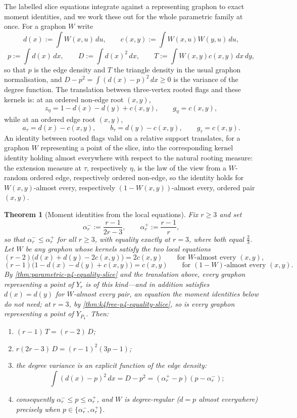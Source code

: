 \documentclass[11pt]{article}
\newtheorem{theorem}{Theorem}
\theoremstyle{definition}
\begin{document}
The labelled slice equations integrate against a representing graphon to exact moment
identities, and we work these out for the whole parametric family at once.  For a
graphon $W$ write
\[
  d(x):=\int W(x,u)\,du,\qquad
  c(x,y):=\int W(x,u)W(y,u)\,du,
\]
\[
  p:=\int d(x)\,dx,\qquad
  D:=\int d(x)^2\,dx,\qquad
  T:=\int W(x,y)c(x,y)\,dx\,dy,
\]
so that $p$ is the edge density and $T$ the triangle density in the usual graphon
normalisation, and $D-p^2=\int(d(x)-p)^2\,dx\ge0$ is the variance of the degree
function.  The translation between three-vertex rooted flags and these kernels is: at an
ordered non-edge root $(x,y)$,
\[
  z_\eta=1-d(x)-d(y)+c(x,y),\qquad g_\eta=c(x,y),
\]
while at an ordered edge root $(x,y)$,
\[
  a_\tau=d(x)-c(x,y),\qquad b_\tau=d(y)-c(x,y),\qquad g_\tau=c(x,y).
\]
An identity between rooted flags valid on a relative support translates, for a graphon
$W$ representing a point of the slice, into the corresponding kernel identity holding
almost everywhere with respect to the natural rooting measure: the extension measure at
$\tau$, respectively $\eta$, is the law of the view from a $W$-random ordered edge,
respectively ordered non-edge, so the identity holds for $W(x,y)$-almost every,
respectively $(1-W(x,y))$-almost every, ordered pair $(x,y)$.

\begin{theorem}[Moment identities from the local equations]\label{thm:parametric-moments}
Fix $r\ge3$ and set
\[
  \alpha_r^-:=\frac{r-1}{2r-3},
  \qquad
  \alpha_r^+:=\frac{r-1}{r},
\]
so that $\alpha_r^-\le\alpha_r^+$ for all $r\ge3$, with equality exactly at $r=3$, where
both equal $\frac23$.  Let $W$ be \emph{any} graphon whose kernels satisfy the two local
equations
\[
  (r-2)\bigl(d(x)+d(y)-2c(x,y)\bigr)=2c(x,y)
  \qquad\text{for $W$-almost every }(x,y),
\]
\[
  (r-1)\bigl(1-d(x)-d(y)+c(x,y)\bigr)=c(x,y)
  \qquad\text{for $(1-W)$-almost every }(x,y).
\]
By \cref{thm:parametric-p4-equality-slice} and the translation above, every graphon
representing a point of $Y_r$ is of this kind---and in addition satisfies
$d(x)=d(y)$ for $W$-almost every pair, an equation the moment identities below do not
need; at $r=3$, by \cref{thm:k4free-p4-equality-slice}, so is every graphon
representing a point of $Y_{P_4}$.  Then:
\begin{enumerate}[label=\textup{(\roman*)}, leftmargin=2.5em]
  \item\label{pm:T} $(r-1)\,T=(r-2)\,D$;
  \item\label{pm:D} $r(2r-3)\,D=(r-1)^2(3p-1)$;
  \item\label{pm:var} the degree variance is an explicit function of the edge density:
  \[
    \int(d(x)-p)^2\,dx
    =
    D-p^2
    =
    (\alpha_r^+-p)(p-\alpha_r^-);
  \]
  \item\label{pm:interval} consequently $\alpha_r^-\le p\le\alpha_r^+$, and $W$ is
  degree-regular ($d=p$ almost everywhere) precisely when
  $p\in\{\alpha_r^-,\alpha_r^+\}$.
\end{enumerate}
\end{theorem}
\end{document}
